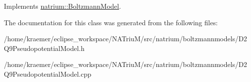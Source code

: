 Implements \hyperlink{classnatrium_1_1BoltzmannModel_ad482e26c4df3014e4b1447ee6cbb44ff}{natrium\-::\-Boltzmann\-Model}.



The documentation for this class was generated from the following files\-:\begin{DoxyCompactItemize}
\item 
/home/kraemer/eclipse\-\_\-workspace/\-N\-A\-Triu\-M/src/natrium/boltzmannmodels/D2\-Q9\-Pseudopotential\-Model.\-h\item 
/home/kraemer/eclipse\-\_\-workspace/\-N\-A\-Triu\-M/src/natrium/boltzmannmodels/D2\-Q9\-Pseudopotential\-Model.\-cpp\end{DoxyCompactItemize}
